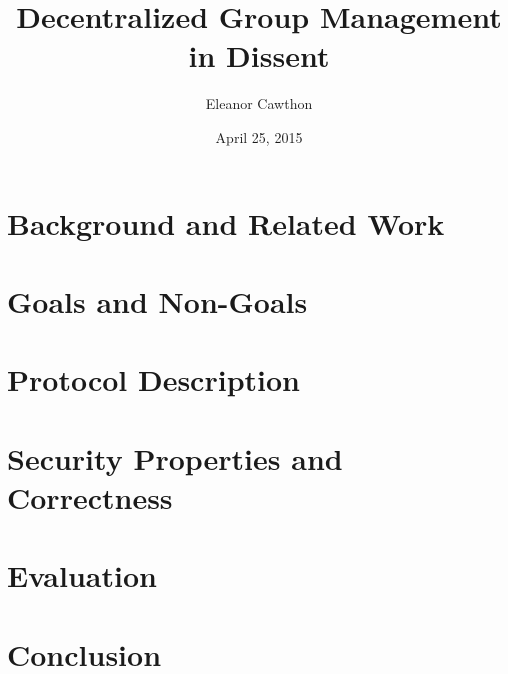 \documentclass[finalcopy]{srpaper}
\title{Decentralized Group Management in Dissent}
\author{Eleanor Cawthon}
\date{April 25, 2015}
\begin{document}
\frontmatter

\preface\label{Chapter:Intro}
% 

\chapter{Background and Related Work}\label{Chapter:Background}
% 

\chapter{Goals and Non-Goals}\label{Chapter:Security}

\chapter{Protocol Description}\label{Chapter:Protocol}

\chapter{Security Properties and Correctness}\label{Chapter:Proofs}

\chapter{Evaluation}\label{Chapter:Evaluation}

\chapter{Conclusion}\label{Chapter:Conclusion}

\end{document}
